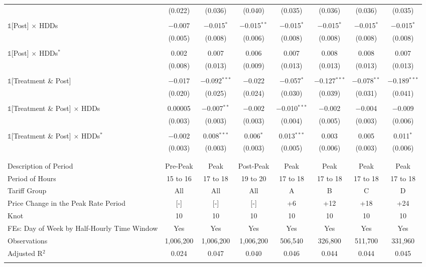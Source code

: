 \begin{table}[!htbp]
\begin{tabular}{@{\extracolsep{10pt}}lccccccc}
  & (0.022) & (0.036) & (0.040) & (0.035) & (0.036) & (0.036) & (0.035) \\ 
  & & & & & & & \\ 
 $\mathbb{1}$[Post] $\times$ HDDs & $-$0.007 & $-$0.015$^{*}$ & $-$0.015$^{**}$ & $-$0.015$^{*}$ & $-$0.015$^{*}$ & $-$0.015$^{*}$ & $-$0.015$^{*}$ \\ 
  & (0.005) & (0.008) & (0.006) & (0.008) & (0.008) & (0.008) & (0.008) \\ 
  & & & & & & & \\ 
 $\mathbb{1}$[Post] $\times$ HDDs$^{*}$ & 0.002 & 0.007 & 0.006 & 0.007 & 0.008 & 0.008 & 0.007 \\ 
  & (0.008) & (0.013) & (0.009) & (0.013) & (0.013) & (0.013) & (0.013) \\ 
  & & & & & & & \\ 
 $\mathbb{1}$[Treatment \& Post] & $-$0.017 & $-$0.092$^{***}$ & $-$0.022 & $-$0.057$^{*}$ & $-$0.127$^{***}$ & $-$0.078$^{**}$ & $-$0.189$^{***}$ \\ 
  & (0.020) & (0.025) & (0.024) & (0.030) & (0.039) & (0.031) & (0.041) \\ 
  & & & & & & & \\ 
 $\mathbb{1}$[Treatment \& Post] $\times$ HDDs & 0.00005 & $-$0.007$^{**}$ & $-$0.002 & $-$0.010$^{***}$ & $-$0.002 & $-$0.004 & $-$0.009 \\ 
  & (0.003) & (0.003) & (0.003) & (0.004) & (0.005) & (0.003) & (0.006) \\ 
  & & & & & & & \\ 
 $\mathbb{1}$[Treatment \& Post] $\times$ HDDs$^{*}$ & $-$0.002 & 0.008$^{***}$ & 0.006$^{*}$ & 0.013$^{***}$ & 0.003 & 0.005 & 0.011$^{*}$ \\ 
  & (0.003) & (0.003) & (0.003) & (0.005) & (0.006) & (0.003) & (0.006) \\ 
  & & & & & & & \\ 
\hline \\[-1.8ex] 
Description of Period & Pre-Peak & Peak & Post-Peak & Peak & Peak & Peak & Peak \\ 
Period of Hours & 15 to 16 & 17 to 18 & 19 to 20 & 17 to 18 & 17 to 18 & 17 to 18 & 17 to 18 \\ 
Tariff Group & All & All & All & A & B & C & D \\ 
Price Change in the Peak Rate Period & [-] & [-] & [-] & +6 & +12 & +18 & +24 \\ 
Knot & 10 & 10 & 10 & 10 & 10 & 10 & 10 \\ 
FEs: Day of Week by Half-Hourly Time Window & Yes & Yes & Yes & Yes & Yes & Yes & Yes \\ 
Observations & 1,006,200 & 1,006,200 & 1,006,200 & 506,540 & 326,800 & 511,700 & 331,960 \\ 
Adjusted R$^{2}$ & 0.024 & 0.047 & 0.040 & 0.046 & 0.044 & 0.044 & 0.045 \\ 
\hline 
\hline \\[-1.8ex] 
\end{tabular} 
\end{table} 
